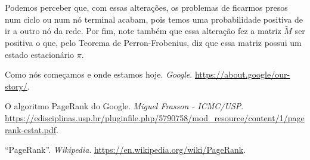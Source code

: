 \documentclass{article}
\begin{document}
Podemos perceber que, com essas alterações, os problemas de ficarmos presos num ciclo ou num nó terminal acabam, pois temos uma probabilidade positiva de ir a outro nó da rede. Por fim, note também que essa alteração fez a matriz $\tilde{M}$ ser positiva o que, pelo Teorema de Perron-Frobenius, diz que essa matriz possui um estado estacionário $\pi$.






\newpage
\begin{thebibliography}{9}

 Como nós começamos e onde estamos hoje. \textit{Google}. \url{https://about.google/our-story/}.

 O algoritmo PageRank do Google. \textit{Miguel Frasson - ICMC/USP}. \url{https://edisciplinas.usp.br/pluginfile.php/5790758/mod_resource/content/1/pagerank-estat.pdf}.

 ``PageRank''. \textit{Wikipedia}. \url{https://en.wikipedia.org/wiki/PageRank}.

\end{thebibliography}
\end{document}
